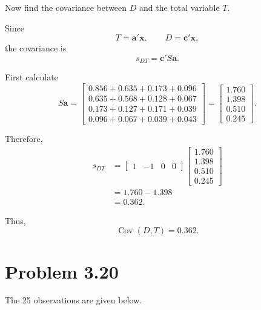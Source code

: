 \documentclass[12pt,a4paper]{article}
\begin{document}
Now find the covariance between \(D\) and the total variable \(T\).

Since
\[
T=\mathbf{a}'\mathbf{x},
\qquad
D=\mathbf{c}'\mathbf{x},
\]
the covariance is
\[
s_{DT}=\mathbf{c}'S\mathbf{a}.
\]

First calculate
\[
S\mathbf{a}
=
\begin{bmatrix}
0.856+0.635+0.173+0.096\\
0.635+0.568+0.128+0.067\\
0.173+0.127+0.171+0.039\\
0.096+0.067+0.039+0.043
\end{bmatrix}
=
\begin{bmatrix}
1.760\\
1.398\\
0.510\\
0.245
\end{bmatrix}.
\]

Therefore,
\[
\begin{aligned}
s_{DT}
&=
\begin{bmatrix}
1&-1&0&0
\end{bmatrix}
\begin{bmatrix}
1.760\\
1.398\\
0.510\\
0.245
\end{bmatrix}\\
&=
1.760-1.398\\
&=
\boxed{0.362}.
\end{aligned}
\]

Thus,
\[
\boxed{\operatorname{Cov}(D,T)=0.362}.
\]

\newpage
\section{Problem 3.20}

The 25 observations are given below.
\end{document}
